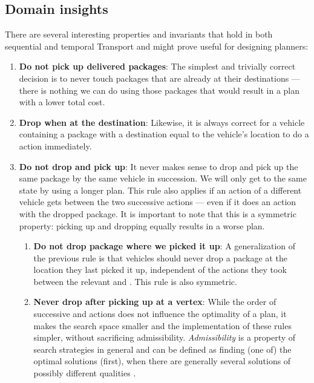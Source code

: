 \subsection{Domain insights}

There are several interesting properties and invariants that hold in both sequential and temporal Transport and might prove useful for designing planners:
\begin{enumerate}
\item \textbf{Do not pick up delivered packages}: The simplest and trivially correct decision is to never touch packages that are already at their destinations --- there is nothing
we can do using those packages that would result in a plan with a lower total cost.

\item \textbf{Drop when at the destination}: Likewise, it is
always correct for a vehicle containing a package with a destination equal
to the vehicle's location to do a \drop{} action immediately.

\item \textbf{Do not drop and pick up}: It never makes sense to drop and pick up
the same package by the same vehicle in succession. We will only get to the same state
by using a longer plan. This rule also applies if an action of a different vehicle
gets between the two successive actions --- even if it does an action with the
dropped package.
It is important to note that this is a symmetric property: picking up and dropping
equally results in a worse plan.
\begin{enumerate}
\item \textbf{Do not drop package where we picked it up}: A generalization
of the previous rule is that vehicles should never drop a package
at the location they last picked it up, independent of the actions they took
between the relevant \pickup{} and \drop{}. This rule is also symmetric.

\item \textbf{Never drop after picking up at a vertex}:
While the order of successive \pickup{} and \drop{} actions does not
influence the optimality of a plan, it makes the search space smaller and the implementation of these rules simpler,
without sacrificing admissibility. \textit{Admissibility} is
a property of search strategies in general and can be defined as finding
(one of) the optimal solutions (first), when there are generally several solutions
of possibly different qualities \citep[Section~3.5]{Russell1995}.
\end{enumerate}


\end{enumerate}
